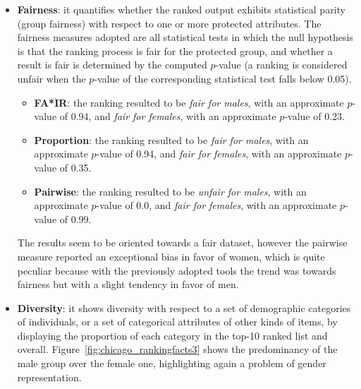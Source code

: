 \begin{itemize}
\item \textbf{Fairness}: it quantifies whether the ranked output exhibits statistical parity (group fairness) with respect to one or more protected attributes. The fairness measures adopted are all statistical tests in which the null hypothesis is that the ranking process is fair for the protected group, and whether a result is fair is determined by the computed \(p\)-value (a ranking is considered unfair when the \(p\)-value of the corresponding statistical test falls below 0.05).
\begin{itemize}
\item \textbf{FA*IR}: the ranking resulted to be \textit{fair for males}, with an approximate \(p\)-value of 0.94, and \textit{fair for females}, with an approximate \(p\)-value of 0.23.
\item \textbf{Proportion}: the ranking resulted to be \textit{fair for males}, with an approximate \(p\)-value of 0.94, and \textit{fair for females}, with an approximate \(p\)-value of 0.35.
\item \textbf{Pairwise}: the ranking resulted to be \textit{unfair for males}, with an approximate \(p\)-value of 0.0, and \textit{fair for females}, with an approximate \(p\)-value of 0.99.
\end{itemize}
The results seem to be oriented towards a fair dataset, however the pairwise measure reported an exceptional bias in favor of women, which is quite peculiar because with the previously adopted tools the trend was towards fairness but with a slight tendency in favor of men.
\item \textbf{Diversity}: it shows diversity with respect to a set of demographic categories of individuals, or a set of categorical attributes of other kinds of items, by displaying the proportion of each category in the top-10 ranked list and overall. Figure~\ref{fig:chicago_rankingfacts3} shows the predominancy of the male group over the female one, highlighting again a problem of gender representation.


\end{itemize}
